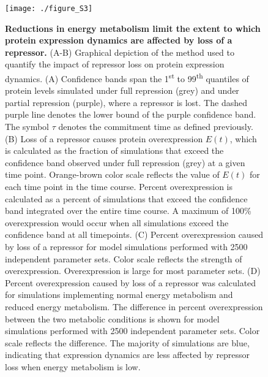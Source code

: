 \begin{figure}[h!]
\centering
\texttt{[image: ./figure\_S3]}
\caption[Reductions in energy metabolism limit the extent to which protein expression dynamics are affected by loss of a repressor.]{\textbf{Reductions in energy metabolism limit the extent to which protein expression dynamics are affected by loss of a repressor.} (A-B) Graphical depiction of the method used to quantify the impact of repressor loss on protein expression dynamics. (A) Confidence bands span the 1\textsuperscript{st} to 99\textsuperscript{th} quantiles of protein levels simulated under full repression (grey) and under partial repression (purple), where a repressor is lost. The dashed purple line denotes the lower bound of the purple confidence band. The symbol $\tau$ denotes the commitment time as defined previously. (B) Loss of a repressor causes protein overexpression $E(t)$, which is calculated as the fraction of simulations that exceed the confidence band observed under full repression (grey) at a given time point. Orange-brown color scale reflects the value of $E(t)$ for each time point in the time course. Percent overexpression is calculated as a percent of simulations that exceed the confidence band integrated over the entire time course. A maximum of 100\% overexpression would occur when all simulations exceed the confidence band at all timepoints. (C) Percent overexpression caused by loss of a repressor for model simulations performed with 2500 independent parameter sets. Color scale reflects the strength of overexpression. Overexpression is large for most parameter sets. (D) Percent overexpression caused by loss of a repressor was calculated for simulations implementing normal energy metabolism and reduced energy metabolism. The difference in percent overexpression between the two metabolic conditions is shown for model simulations performed with 2500 independent parameter sets. Color scale reflects the difference. The majority of simulations are blue, indicating that expression dynamics are less affected by repressor loss when energy metabolism is low.}
\label{fig:metabolism:figS3}
\end{figure}

